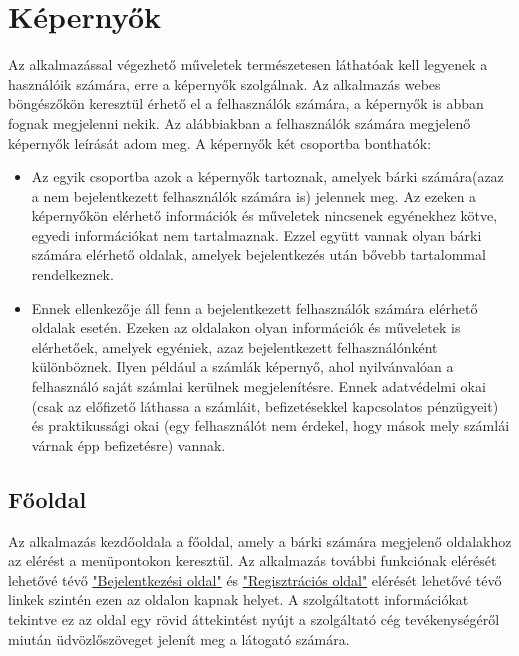 \documentclass[centeredchapter]{thesis-ekf}
\theoremstyle{definition}
\theoremstyle{remark}
\begin{document}
\section{Képernyők}

Az alkalmazással végezhető műveletek természetesen láthatóak kell legyenek a használóik számára, erre a képernyők szolgálnak. Az alkalmazás webes böngészőkön keresztül érhető el a felhasználók számára, a képernyők is abban fognak megjelenni nekik. Az alábbiakban a felhasználók számára megjelenő képernyők leírását adom meg.
A képernyők két csoportba bonthatók:
 
 \begin{itemize}
 	\item Az egyik csoportba azok a képernyők tartoznak, amelyek bárki számára(azaz a nem bejelentkezett felhasználók számára is) jelennek meg. Az ezeken a képernyőkön elérhető információk és műveletek nincsenek egyénekhez kötve, egyedi információkat nem tartalmaznak. Ezzel együtt vannak olyan bárki számára elérhető oldalak, amelyek bejelentkezés után bővebb tartalommal rendelkeznek.
 	\item Ennek ellenkezője áll fenn a bejelentkezett felhasználók számára elérhető oldalak esetén. Ezeken az oldalakon olyan információk és műveletek is elérhetőek, amelyek egyéniek, azaz bejelentkezett felhasználónként különböznek. Ilyen például a számlák képernyő, ahol nyilvánvalóan a felhasználó saját számlai kerülnek megjelenítésre. Ennek adatvédelmi okai (csak az előfizető láthassa a számláit, befizetésekkel kapcsolatos pénzügyeit) és praktikussági okai (egy felhasználót nem érdekel, hogy mások mely számlái várnak épp befizetésre) vannak.
 \end{itemize}
  

\subsection{Főoldal}\hypertarget{leiras-fooldal}{}

Az alkalmazás kezdőoldala a főoldal, amely a bárki számára megjelenő oldalakhoz az elérést a menüpontokon keresztül. Az alkalmazás további funkciónak elérését lehetővé tévő \hyperlink{leiras-bejelentkezesi}{"Bejelentkezési oldal"} és \hyperlink{leiras-regisztracios}{"Regisztrációs oldal"} elérését lehetővé tévő linkek szintén ezen az oldalon kapnak helyet. A szolgáltatott információkat tekintve ez az oldal egy rövid áttekintést nyújt a szolgáltató cég tevékenységéről miután üdvözlőszöveget jelenít meg a látogató számára.
\end{document}
